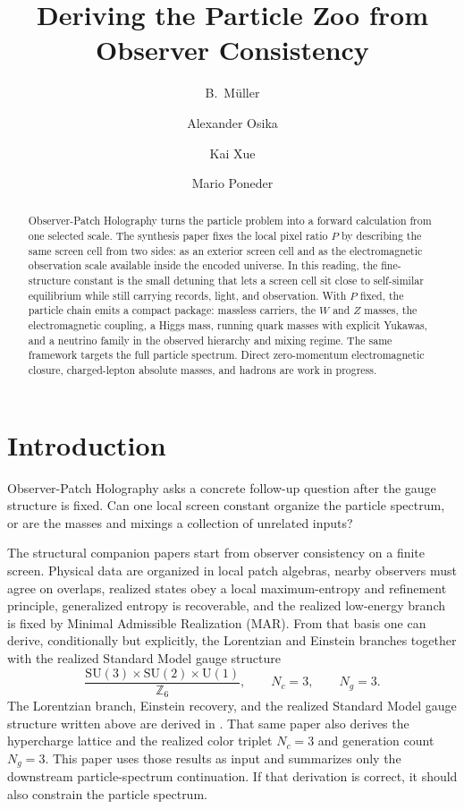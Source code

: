 \documentclass[11pt]{article}
\title{Deriving the Particle Zoo from\\
Observer Consistency}
\author{B.\ M\"uller \and Alexander Osika \and Kai Xue \and Mario Poneder}
\date{\OPHPaperReleaseDate}
\newcommand{\SU}{\mathrm{SU}}
\newcommand{\U}{\mathrm{U}}
\begin{document}
\maketitle
\OPHPaperReleaseBanner

\begin{abstract}
Observer-Patch Holography turns the particle problem into a forward calculation from one selected scale. The synthesis paper fixes the local pixel ratio \(P\) by describing the same screen cell from two sides: as an exterior screen cell and as the electromagnetic observation scale available inside the encoded universe. In this reading, the fine-structure constant is the small detuning that lets a screen cell sit close to self-similar equilibrium while still carrying records, light, and observation. With \(P\) fixed, the particle chain emits a compact package: massless carriers, the \(W\) and \(Z\) masses, the electromagnetic coupling, a Higgs mass, running quark masses with explicit Yukawas, and a neutrino family in the observed hierarchy and mixing regime. The same framework targets the full particle spectrum. Direct zero-momentum electromagnetic closure, charged-lepton absolute masses, and hadrons are work in progress.
\end{abstract}

\section{Introduction}

Observer-Patch Holography asks a concrete follow-up question after the gauge structure is fixed.
Can one local screen constant organize the particle spectrum, or are the masses and mixings a
collection of unrelated inputs?

The structural companion papers start from observer consistency on a finite screen. Physical data are organized in local patch algebras, nearby observers must agree on overlaps, realized states obey a local maximum-entropy and refinement principle, generalized entropy is recoverable, and the realized low-energy branch is fixed by Minimal Admissible Realization (MAR). From that basis one can derive, conditionally but explicitly, the Lorentzian and Einstein branches together with the realized Standard Model gauge structure
\[
\frac{\SU(3)\times\SU(2)\times\U(1)}{\mathbb Z_6},
\qquad
N_c=3,
\qquad
N_g=3.
\]
The Lorentzian branch, Einstein recovery, and the realized Standard Model gauge structure written
above are derived in \cite{ophcompact}. That same paper also derives the hypercharge lattice and
the realized color triplet \(N_c=3\) and generation count \(N_g=3\). This paper uses those results as input and summarizes only the
downstream particle-spectrum continuation. If that derivation is correct, it should also constrain the particle spectrum.
\end{document}
